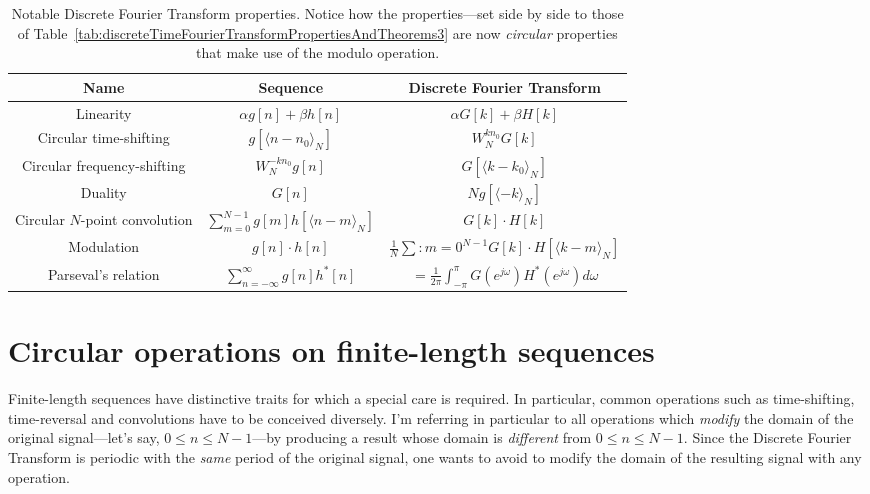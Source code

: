 \documentclass[\documentfontsize, twocolumn]{\classname}
\begin{document}
\begin{table*}[ht]
\centering
\begin{tabular}{ccc}
    \hline
    \textbf{Name} & \textbf{Sequence} & \textbf{Discrete Fourier Transform} \\
    \hline
    Linearity & $\alpha g[n] + \beta h[n]$ & $\alpha G[k] + \beta H[k]$\\
    Circular time-shifting & $g[\langle n-n_0\rangle_N]$ & $W_N^{kn_0} G[k]$ \\
    Circular frequency-shifting & $W_N^{-kn_0}g[n]$ & $G[\langle k - k_0 \rangle_N]$ \\
    Duality & $G[n]$ & $Ng[\langle -k \rangle_N]$ \\
    Circular $N$-point convolution & $\sum_{m=0}^{N-1} g[m] h[\langle n - m \rangle_N]$ &$ G[k] \cdot H[k]$\\
    Modulation & $g[n] \cdot h[n]$ &$ \frac{1}{N} \sum:{m=0}^{N-1} G[k] \cdot H[\langle k - m\rangle_N]$\\
    \hline
    Parseval's relation & $\sum_{n=-\infty}^\infty g[n]h^*[n]$ &$= \frac 1 {2\pi} \int_{-\pi}^\pi G(e^{j\omega})H^*(e^{j\omega})d\omega$\\
    \hline
\end{tabular}
\caption{Notable Discrete Fourier Transform properties. Notice how the properties---set side by side to those of Table~\ref{tab:discreteTimeFourierTransformPropertiesAndTheorems3} are now \emph{circular} properties that make use of the modulo operation.}\label{tab:discreteFourierTransformPropertiesAndTheorems3}
\end{table*}

\section{Circular operations on finite-length sequences}

Finite-length sequences have distinctive traits for which a special care is required. In particular, common operations such as time-shifting, time-reversal and convolutions have to be conceived diversely. I'm referring in particular to all operations which \emph{modify} the domain of the original signal---let's say, $0 \leq n \leq N-1$---by producing a result whose domain is \emph{different} from $0 \leq n \leq N-1$. Since the Discrete Fourier Transform is periodic with the \emph{same} period of the original signal, one wants to avoid to modify the domain of the resulting signal with any operation.
\end{document}
